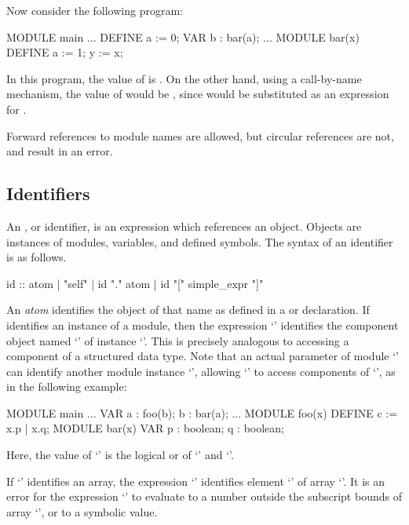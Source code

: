 \noindent Now consider the following program:
%
\begin{nusmvCode}
MODULE main
...
 DEFINE
   a := 0;
 VAR
   b : bar(a);
...
MODULE bar(x)
 DEFINE
   a := 1;
   y := x;
\end{nusmvCode}
%
In this program, the value of  is . On the other hand,
using a call-by-name mechanism, the value of  would be
, since  would be substituted as an expression for
.

\noindent Forward references to module names are allowed, but circular
references are not, and result in an error.

\subsection{Identifiers}
\label{Identifiers}
%
An , or identifier, is an expression which references an
object. Objects are instances of modules, variables, and defined
symbols. The syntax of an identifier is as follows.
%
\begin{Grammar}
id :: atom
    | "self"
    | id "." atom
    | id "[" simple_expr "]"
\end{Grammar}
%
An \emph{atom} identifies the object of that name as defined in a
 or  declaration. If  identifies an
instance of a module, then the expression `' identifies
the component object named `' of instance `'. This
is precisely analogous to accessing a component of a structured data
type. Note that an actual parameter of module `' can
identify another module instance `', allowing `'
to access components of `', as in the following example:
%
\begin{nusmvCode}
MODULE main
...  VAR
  a : foo(b);
  b : bar(a);
...
MODULE foo(x)
 DEFINE
   c := x.p | x.q;
MODULE bar(x)
 VAR
   p : boolean;
   q : boolean;
\end{nusmvCode}
%
Here, the value of `' is the logical or of `' and
`'.

\noindent If `' identifies an array, the expression
`' identifies element `' of array `'. It is
an error for the expression `' to evaluate to a number outside
the subscript bounds of array `', or to a symbolic value.

